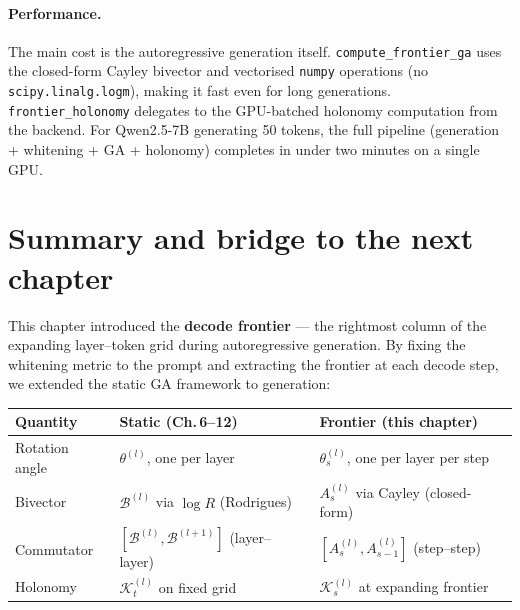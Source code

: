 \documentclass[11pt, twoside, openright]{memoir}
\newcommand{\bivec}[1]{\mathcal{B}^{(#1)}}  %
\numberwithin{equation}{chapter}
\begin{document}
\paragraph{Performance.}
The main cost is the autoregressive generation itself.
\texttt{compute\_frontier\_ga} uses the closed-form Cayley
bivector and vectorised \texttt{numpy} operations (no
\texttt{scipy.linalg.logm}), making it fast even for long
generations.  \texttt{frontier\_holonomy} delegates to the
GPU-batched holonomy computation from the backend.
For Qwen2.5-7B generating 50 tokens, the full pipeline
(generation + whitening + GA + holonomy) completes in under
two minutes on a single GPU.


\section{Summary and bridge to the next chapter}
\label{sec:frontier-summary}

This chapter introduced the \textbf{decode frontier} --- the
rightmost column of the expanding layer--token grid during
autoregressive generation.  By fixing the whitening metric to the
prompt and extracting the frontier at each decode step, we
extended the static GA framework to generation:

\begin{center}
\renewcommand{\arraystretch}{1.4}\small
\begin{tabular}{@{}L{3.2cm} L{4.5cm} L{4.5cm}@{}}
\toprule
\textbf{Quantity} & \textbf{Static (Ch.\,6--12)} &
  \textbf{Frontier (this chapter)} \\
\midrule
Rotation angle &
  $\theta^{(l)}$, one per layer &
  $\theta^{(l)}_s$, one per layer per step \\
Bivector &
  $\bivec{l}$ via $\log R$ (Rodrigues) &
  $A^{(l)}_s$ via Cayley (closed-form) \\
Commutator &
  $[\bivec{l}, \bivec{l+1}]$ (layer--layer) &
  $[A^{(l)}_s, A^{(l)}_{s-1}]$ (step--step) \\
Holonomy &
  $\mathcal{K}^{(l)}_t$ on fixed grid &
  $\mathcal{K}^{(l)}_s$ at expanding frontier \\
\bottomrule
\end{tabular}
\end{center}
\end{document}
